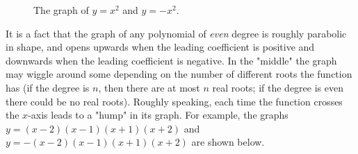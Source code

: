 \documentclass[11pt]{book}               %
\begin{document}
%
\begin{figure}[bh]
\begin{center}
 \quad
{}
\label{parabolas}
\end{center}
\caption{The graph of $y = x^2$ and $y = -x^2$.}
\label{parabolas}
\end{figure}


It is a fact that the graph of any polynomial of \emph{even} degree is roughly parabolic in shape, and opens
upwards when the leading coefficient is positive and downwards when the leading coefficient is negative.  In the "middle" the graph may wiggle around some depending on the number of different roots the function has (if the degree is $n$, then there are at most $n$ real roots; if the degree is even there could be no real roots).  Roughly speaking, each time the function crosses the $x$-axis leads to a "hump" in its graph. For example,  the graphs $y=(x-2)(x-1)(x+1)(x+2)$ and $y=-(x-2)(x-1)(x+1)(x+2)$ are shown below. 
\end{document}
